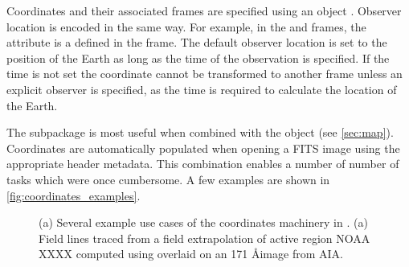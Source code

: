 Coordinates and their associated frames are specified using an \astropy {} object \citep[see Section 3.3 of][]{astropy2018}. 
Observer location is encoded in the same way.
For example, in the \hpc and \hcc frames, the  attribute is a  defined in the \hgs frame.
The default observer location is set to the position of the Earth as long as the time of the observation is specified.
If the time is not set the coordinate cannot be transformed to another frame unless an explicit observer is specified, as the time is required to calculate the location of the Earth.

The  subpackage is most useful when combined with the  object (see \autoref{sec:map}).
Coordinates are automatically populated when opening a FITS image using the appropriate header metadata.
This combination enables a number of number of tasks which were once cumbersome. 
A few examples are shown in \autoref{fig:coordinates_examples}.


\begin{figure}
    \caption{(a) Several example use cases of the coordinates machinery in \sunpy. 
    (a) Field lines traced from a field extrapolation of active region NOAA XXXX computed using  overlaid on an 171 \AA image from AIA.}
    \label{fig:coordinates_examples}
\end{figure}




